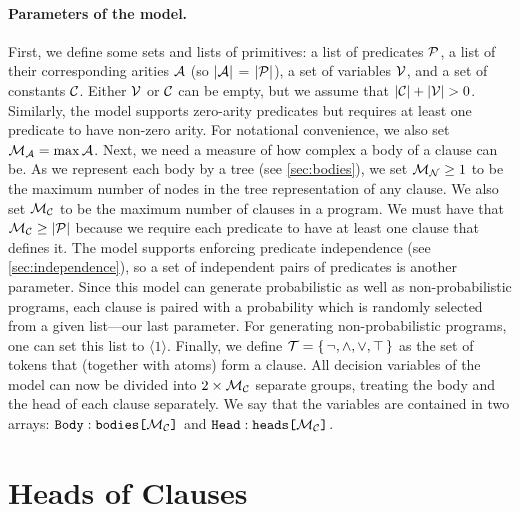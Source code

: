 \paragraph*{Parameters of the model.} First, we define some sets and lists of
primitives: a list of predicates $\predicates{}$, a list of their corresponding
arities $\arities{}$ (so $|\arities{}|$ = $|\predicates{}|$), a set of variables
$\variables{}$, and a set of constants $\constants{}$. Either $\variables{}$ or
$\constants{}$ can be empty, but we assume that
$|\constants{}| + |\variables{}| > 0$. Similarly, the model supports zero-arity
predicates but requires at least one predicate to have non-zero arity. For
notational convenience, we also set $\maxArity{} = \max \arities{}$. Next, we
need a measure of how complex a body of a clause can be. As we represent each
body by a tree (see \cref{sec:bodies}), we set $\maxNumNodes{} \ge 1$ to be the
maximum number of nodes in the tree representation of any clause. We also set
$\maxNumClauses{}$ to be the maximum number of clauses in a program. We must
have that $\maxNumClauses{} \ge |\predicates{}|$ because we require each
predicate to have at least one clause that defines it. The model supports
enforcing predicate independence (see \cref{sec:independence}), so a set of
independent pairs of predicates is another parameter. Since this model can
generate probabilistic as well as non-probabilistic programs, each clause is
paired with a probability which is randomly selected from a given list---our
last parameter. For generating non-probabilistic programs, one can set this list
to $\langle 1 \rangle$. Finally, we define
$\tokens{} = \{\, \neg, \land, \lor, \top \,\}$ as the set of tokens that
(together with atoms) form a clause. All decision variables of the model can now
be divided into $2 \times \maxNumClauses{}$ separate groups, treating the body
and the head of each clause separately. We say that the variables are contained
in two arrays: $\arrayt{bodies}{\maxNumClauses{}}{Body}$ and
$\arrayt{heads}{\maxNumClauses{}}{Head}$.

\section{Heads of Clauses}\label{sec:heads}

